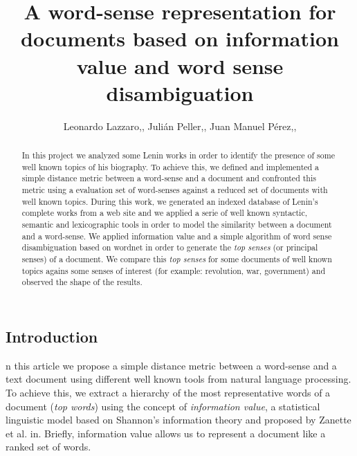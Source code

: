 \documentclass{pnastwo}
\begin{document}
\title{A word-sense representation for documents based on information value and word sense disambiguation}

\author{Leonardo Lazzaro,,
Julián Peller,,
Juan Manuel Pérez,,
}


\maketitle

\begin{article}
\begin{abstract}
In this project we analyzed some Lenin works in order to identify the presence of some well known topics of his biography. To achieve this, we defined and implemented a simple distance metric between a word-sense and a document and confronted this metric using a evaluation set of word-senses against a reduced set of  documents with well known topics. During this work, we generated an indexed database of Lenin's complete works from a web site\cite{LENIN} and we applied a serie of well known syntactic, semantic and lexicographic tools in order to model the similarity between a document and a word-sense. We applied information value\cite{DARWIN} and a simple algorithm of word sense disambiguation\cite{LESK} based on wordnet\cite{WORDNET} in order to generate the \textit{top senses} (or principal senses) of a document. We compare this \textit{top senses} for some documents of well known topics agains some senses of interest (for example: revolution, war, government) and observed the shape of the results. 
\end{abstract}



\section{Introduction}

n this article we propose a simple distance metric between a word-sense and a text document using different well known tools from natural language processing. To achieve this, we extract a hierarchy of the most representative words of a document (\textit{top words}) using the concept of \textit{information value}, a statistical linguistic model based on Shannon's information theory and proposed by Zanette et al. in\cite{DARWIN}. Briefly, information value allows us to represent a document like a ranked set of words. 


\end{article}
\end{document}
